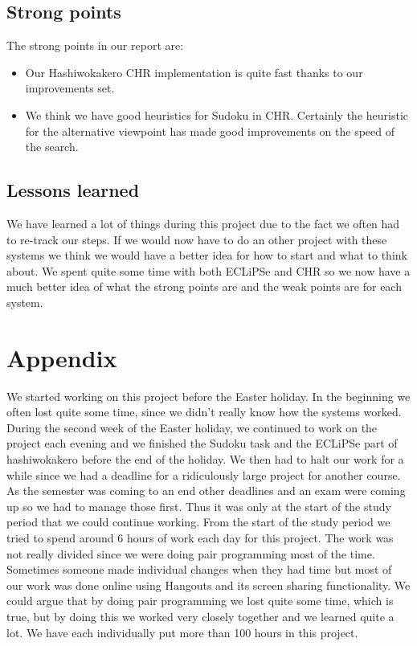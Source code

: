 \documentclass{report}
\newcommand{\mychapter}[2]{
    \setcounter{chapter}{#1}
    \setcounter{section}{0}
    \chapter*{#2}
    \addcontentsline{toc}{chapter}{#2}
}
\begin{document}
\section{Strong points}
The strong points in our report are:
\begin{itemize}
    \item Our Hashiwokakero CHR implementation is quite fast thanks to our improvements set.
    \item We think we have good heuristics for Sudoku in CHR. Certainly the heuristic for the alternative viewpoint has made good improvements on the speed of the search.
\end{itemize}

\section{Lessons learned}
We have learned a lot of things during this project due to the fact we often had to re-track our steps. If we would now have to do an other project with these systems we think we would have a better idea for how to start and what to think about. We spent quite some time with both ECLiPSe and CHR so we now have a much better idea of what the strong points are and the weak points are for each system.

\mychapter{4}{Appendix}
We started working on this project before the Easter holiday. In the beginning we often lost quite some time, since we didn't really know how the systems worked. During the second week of the Easter holiday, we continued to work on the project each evening and we finished the Sudoku task and the ECLiPSe part of hashiwokakero before the end of the holiday. We then had to halt our work for a while since we had a deadline for a ridiculously large project for another course. As the semester was coming to an end other deadlines and an exam were coming up so we had to manage those first. Thus it was only at the start of the study period that we could continue working. From the start of the study period we tried to spend around 6 hours of work each day for this project. The work was not really divided since we were doing pair programming most of the time. Sometimes someone made individual changes when they had time but most of our work was done online using Hangouts and its screen sharing functionality. We could argue that by doing pair programming we lost quite some time, which is true, but by doing this we worked very closely together and we learned quite a lot. We have each individually put more than 100 hours in this project.
\end{document}
